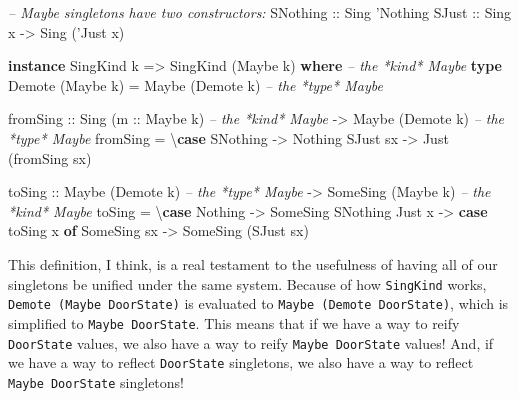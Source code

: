 \documentclass[]{article}
\newenvironment{Shaded}{}{}
\newcommand{\CommentTok}[1]{\textcolor[rgb]{0.38,0.63,0.69}{\textit{#1}}}
\newcommand{\DataTypeTok}[1]{\textcolor[rgb]{0.56,0.13,0.00}{#1}}
\newcommand{\FunctionTok}[1]{\textcolor[rgb]{0.02,0.16,0.49}{#1}}
\newcommand{\KeywordTok}[1]{\textcolor[rgb]{0.00,0.44,0.13}{\textbf{#1}}}
\newcommand{\NormalTok}[1]{#1}
\newcommand{\OtherTok}[1]{\textcolor[rgb]{0.00,0.44,0.13}{#1}}
\begin{document}
\begin{Shaded}
\begin{Highlighting}[]
\CommentTok{-- Maybe singletons have two constructors:}
\DataTypeTok{SNothing}\OtherTok{ ::} \DataTypeTok{Sing}\NormalTok{ '}\DataTypeTok{Nothing}
\DataTypeTok{SJust}\OtherTok{    ::} \DataTypeTok{Sing}\NormalTok{ x }\OtherTok{->} \DataTypeTok{Sing}\NormalTok{ ('}\DataTypeTok{Just}\NormalTok{ x)}

\KeywordTok{instance} \DataTypeTok{SingKind}\NormalTok{ k }\OtherTok{=>} \DataTypeTok{SingKind}\NormalTok{ (}\DataTypeTok{Maybe}\NormalTok{ k) }\KeywordTok{where}     \CommentTok{-- the *kind* Maybe}
    \KeywordTok{type} \DataTypeTok{Demote}\NormalTok{ (}\DataTypeTok{Maybe}\NormalTok{ k) }\FunctionTok{=} \DataTypeTok{Maybe}\NormalTok{ (}\DataTypeTok{Demote}\NormalTok{ k)        }\CommentTok{-- the *type* Maybe}

\NormalTok{    fromSing}
\OtherTok{        ::} \DataTypeTok{Sing}\NormalTok{ (}\OtherTok{m ::} \DataTypeTok{Maybe}\NormalTok{ k)        }\CommentTok{-- the *kind* Maybe}
        \OtherTok{->} \DataTypeTok{Maybe}\NormalTok{ (}\DataTypeTok{Demote}\NormalTok{ k)           }\CommentTok{-- the *type* Maybe}
\NormalTok{    fromSing }\FunctionTok{=}\NormalTok{ \textbackslash{}}\KeywordTok{case}
        \DataTypeTok{SNothing} \OtherTok{->} \DataTypeTok{Nothing}
        \DataTypeTok{SJust}\NormalTok{ sx }\OtherTok{->} \DataTypeTok{Just}\NormalTok{ (fromSing sx)}

\NormalTok{    toSing}
\OtherTok{        ::} \DataTypeTok{Maybe}\NormalTok{ (}\DataTypeTok{Demote}\NormalTok{ k)             }\CommentTok{-- the *type* Maybe}
        \OtherTok{->} \DataTypeTok{SomeSing}\NormalTok{ (}\DataTypeTok{Maybe}\NormalTok{ k)           }\CommentTok{-- the *kind* Maybe}
\NormalTok{    toSing }\FunctionTok{=}\NormalTok{ \textbackslash{}}\KeywordTok{case}
        \DataTypeTok{Nothing} \OtherTok{->} \DataTypeTok{SomeSing} \DataTypeTok{SNothing}
        \DataTypeTok{Just}\NormalTok{ x  }\OtherTok{->} \KeywordTok{case}\NormalTok{ toSing x }\KeywordTok{of}
          \DataTypeTok{SomeSing}\NormalTok{ sx }\OtherTok{->} \DataTypeTok{SomeSing}\NormalTok{ (}\DataTypeTok{SJust}\NormalTok{ sx)}
\end{Highlighting}
\end{Shaded}

This definition, I think, is a real testament to the usefulness of having all of
our singletons be unified under the same system. Because of how
\texttt{SingKind} works, \texttt{Demote\ (Maybe\ DoorState)} is evaluated to
\texttt{Maybe\ (Demote\ DoorState)}, which is simplified to
\texttt{Maybe\ DoorState}. This means that if we have a way to reify
\texttt{DoorState} values, we also have a way to reify \texttt{Maybe\ DoorState}
values! And, if we have a way to reflect \texttt{DoorState} singletons, we also
have a way to reflect \texttt{Maybe\ DoorState} singletons!
\end{document}
